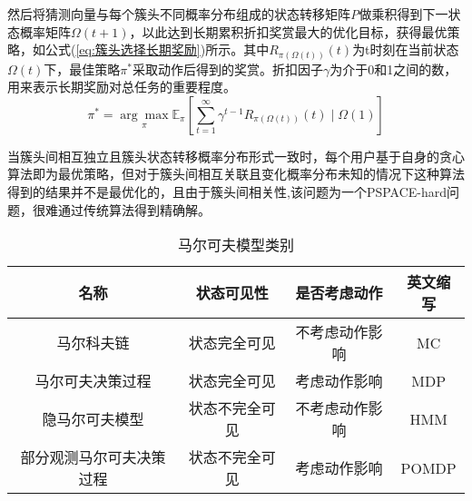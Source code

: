 然后将猜测向量与每个簇头不同概率分布组成的状态转移矩阵\textit{P}做乘积得到下一状态概率矩阵$\Omega \left ( t+1 \right )$，以此达到长期累积折扣奖赏最大的优化目标，获得最优策略，如公式(\ref{eq:簇头选择长期奖励})所示。其中$R_{\pi\left ( \Omega \left ( t \right ) \right )}\left ( t \right )$为t时刻在当前状态$\Omega \left ( t \right ) $下，最佳策略$\pi^{*}$采取动作后得到的奖赏。折扣因子$\gamma$为介于0和1之间的数，用来表示长期奖励对总任务的重要程度。
\begin{equation}\label{eq:簇头选择长期奖励}
\pi ^{*}= \underset{\pi }{\arg \max}\mathbb{E}_{\pi}\left [ \sum_{t=1}^{\infty }\gamma ^{t-1} R_{\pi\left ( \Omega \left ( t \right ) \right )}\left ( t \right )\mid \Omega \left ( 1 \right )\right ]
\end{equation}

当簇头间相互独立且簇头状态转移概率分布形式一致时，每个用户基于自身的贪心算法即为最优策略\cite{Ahmad2009Optimality}，但对于簇头间相互关联且变化概率分布未知的情况下这种算法得到的结果并不是最优化的，且由于簇头间相关性,该问题为一个PSPACE-hard问题\cite{8303773}，很难通过传统算法得到精确解。
\begin{table}[htbp]
	\caption{马尔可夫模型类别}\label{tab:马尔可夫分类}
	\vspace{0.5em}\centering\wuhao
	\begin{tabular}{cccc}
		\toprule[1.5pt]
		名称 & 状态可见性 & 是否考虑动作 & 英文缩写 \\
		\midrule[1pt]
		马尔科夫链 & 状态完全可见 & 不考虑动作影响 & MC \\
		马尔可夫决策过程 & 状态完全可见 & 考虑动作影响 & MDP\\
		隐马尔可夫模型 & 状态不完全可见 & 不考虑动作影响 & HMM \\
		部分观测马尔可夫决策过程 & 状态不完全可见 & 考虑动作影响 & POMDP \\
		\bottomrule[1.5pt]
	\end{tabular}
\end{table}


